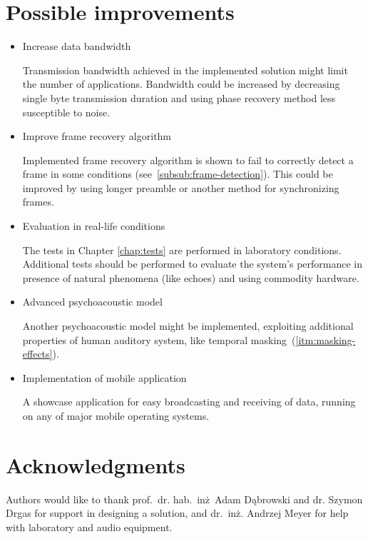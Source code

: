 \documentclass[english,bachelor,a4paper,oneside]{ppfcmthesis}
\begin{document}
\section{Possible improvements}

\begin{itemize}
\item Increase data bandwidth

Transmission bandwidth achieved in the implemented solution might limit the number of applications.
Bandwidth could be increased by decreasing single byte transmission duration and using phase recovery method
less susceptible to noise.

\item Improve frame recovery algorithm

Implemented frame recovery algorithm is shown to fail to correctly detect a frame in some conditions (see~\ref{subsub:frame-detection}).
This could be improved by using longer preamble or another method for synchronizing frames.

\item Evaluation in real-life conditions

The tests in Chapter \ref{chap:tests} are performed in laboratory conditions. Additional tests should be
performed to evaluate the system's performance in presence of natural phenomena (like echoes) and using commodity hardware.

\item Advanced psychoacoustic model

Another psychoacoustic model might be implemented, exploiting additional properties of human auditory system, like
temporal masking~(\ref{itm:masking-effects}).

\item Implementation of mobile application

A showcase application for easy broadcasting and receiving of data, running on any of major mobile operating systems.
\end{itemize}

\section{Acknowledgments}

Authors would like to thank prof.~dr. hab.~inż~Adam Dąbrowski and dr. Szymon Drgas for support in designing a solution,
and dr.~inż. Andrzej Meyer for help with laboratory and audio equipment.


\cleardoublepage\appendix%

\listoffigures

{\raggedright\sloppy\small}

\ppcolophon
\end{document}
